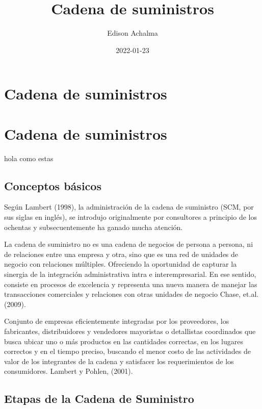\documentclass[
  jou,
  floatsintext,
  longtable,
  a4paper,
  nolmodern,
  notxfonts,
  notimes,
  colorlinks=true,linkcolor=blue,citecolor=blue,urlcolor=blue]{apa7}
\title{Cadena de suministros}
\author{Edison Achalma}
\affiliation{
{Economía, Universidad Nacional de San Cristóbal de Huamanga}}
\date{2022-01-23}
\begin{document}
\maketitle

\hypertarget{toc}{}
\tableofcontents
\newpage
\section[Introduction]{Cadena de suministros}

\setcounter{secnumdepth}{-\maxdimen} %

\setlength\LTleft{0pt}


\section{Cadena de suministros}\label{cadena-de-suministros}

hola como estas

\subsection{Conceptos básicos}\label{conceptos-buxe1sicos}

Según Lambert (1998), la administración de la cadena de suministro (SCM,
por sus siglas en inglés), se introdujo originalmente por consultores a
principio de los ochentas y subsecuentemente ha ganado mucha atención.

La cadena de suministro no es una cadena de negocios de persona a
persona, ni de relaciones entre una empresa y otra, sino que es una red
de unidades de negocio con relaciones múltiples. Ofreciendo la
oportunidad de capturar la sinergia de la integración administrativa
intra e interempresarial. En ese sentido, consiste en procesos de
excelencia y representa una nueva manera de manejar las transacciones
comerciales y relaciones con otras unidades de negocio Chase, et.al.
(2009).

Conjunto de empresas eficientemente integradas por los proveedores, los
fabricantes, distribuidores y vendedores mayoristas o detallistas
coordinados que busca ubicar uno o más productos en las cantidades
correctas, en los lugares correctos y en el tiempo preciso, buscando el
menor costo de las actividades de valor de los integrantes de la cadena
y satisfacer los requerimientos de los consumidores. Lambert y Pohlen,
(2001).

\subsection{Etapas de la Cadena de
Suministro}\label{etapas-de-la-cadena-de-suministro}
\end{document}
